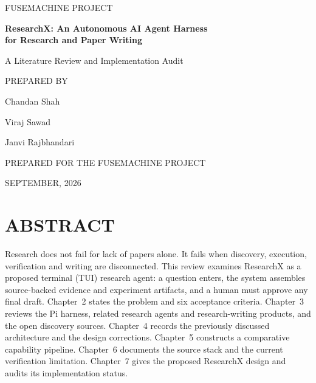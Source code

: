 \documentclass[12pt,a4paper]{report}
\numberwithin{equation}{chapter}
\begin{document}
\begin{titlepage}
\begin{center}
{\large FUSEMACHINE PROJECT\par}
\vspace{1.0cm}
{\Large\bfseries ResearchX: An Autonomous AI Agent Harness\\for Research and Paper Writing\par}
\vspace{0.5cm}
{\large A Literature Review and Implementation Audit\par}
\vspace{1.0cm}
{\large PREPARED BY\par}
\vspace{0.3cm}
{\large Chandan Shah\par}
{\large Viraj Sawad\par}
{\large Janvi Rajbhandari\par}
\vspace{1.0cm}
{\large PREPARED FOR THE FUSEMACHINE PROJECT\par}
\vspace{0.5cm}
{\large SEPTEMBER, 2026\par}
\end{center}
\end{titlepage}


\chapter*{ABSTRACT}
Research does not fail for lack of papers alone. It fails when discovery,
execution, verification and writing are disconnected. This review examines
ResearchX as a proposed terminal (TUI) research agent: a question enters, the
system assembles source-backed evidence and experiment artifacts, and a human
must approve any final draft. Chapter~2 states the problem and six acceptance
criteria. Chapter~3 reviews the Pi harness, related research agents and
research-writing products, and the open discovery sources. Chapter~4 records
the previously discussed architecture and the design corrections. Chapter~5
constructs a comparative capability pipeline. Chapter~6 documents the source
stack and the current verification limitation. Chapter~7 gives the proposed
ResearchX design and audits its implementation status.
\end{document}
